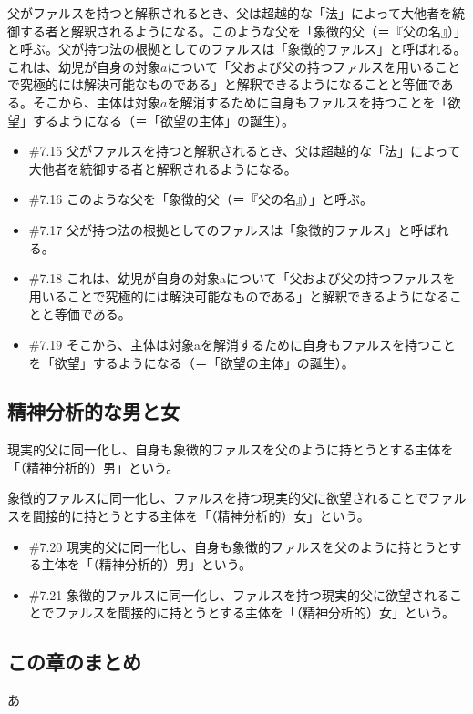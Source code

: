 父がファルスを持つと解釈されるとき、父は超越的な「法」によって大他者を統御する者と解釈されるようになる。このような父を「象徴的父（＝『父の名』）」と呼ぶ。父が持つ法の根拠としてのファルスは「象徴的ファルス」と呼ばれる。これは、幼児が自身の対象\(a\)について「父および父の持つファルスを用いることで究極的には解決可能なものである」と解釈できるようになることと等価である。そこから、主体は対象\(a\)を解消するために自身もファルスを持つことを「欲望」するようになる（＝「欲望の主体」の誕生）。

\begin{note}{}
  \begin{itemize}
    \tightlist
    \item{\#7.15}
      父がファルスを持つと解釈されるとき、父は超越的な「法」によって大他者を統御する者と解釈されるようになる。
    \item{\#7.16}
      このような父を「象徴的父（＝『父の名』）」と呼ぶ。
    \item{\#7.17}
      父が持つ法の根拠としてのファルスは「象徴的ファルス」と呼ばれる。
    \item{\#7.18}
      これは、幼児が自身の対象aについて「父および父の持つファルスを用いることで究極的には解決可能なものである」と解釈できるようになることと等価である。
    \item{\#7.19}
      そこから、主体は対象aを解消するために自身もファルスを持つことを「欲望」するようになる（＝「欲望の主体」の誕生）。
  \end{itemize}
\end{note}

\subsection{精神分析的な男と女}\label{ux7cbeux795eux5206ux6790ux7684ux306aux7537ux3068ux5973}

現実的父に同一化し、自身も象徴的ファルスを父のように持とうとする主体を「（精神分析的）男」という。

象徴的ファルスに同一化し、ファルスを持つ現実的父に欲望されることでファルスを間接的に持とうとする主体を「（精神分析的）女」という。

\begin{note}{}
  \begin{itemize}
    \tightlist
    \item{\#7.20}
      現実的父に同一化し、自身も象徴的ファルスを父のように持とうとする主体を「（精神分析的）男」という。
    \item{\#7.21}
      象徴的ファルスに同一化し、ファルスを持つ現実的父に欲望されることでファルスを間接的に持とうとする主体を「（精神分析的）女」という。
  \end{itemize}
\end{note}

\subsection{この章のまとめ}\label{ux3053ux306eux7ae0ux306eux307eux3068ux3081}

あ
